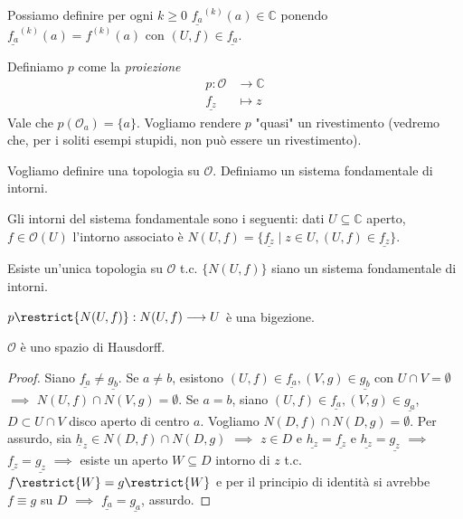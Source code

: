 \begin{oss}
  Possiamo definire per ogni $k \ge 0$ $\underline{f_a}^{(k)}(a) \in \mathbb{C}$ ponendo $\underline{f_a}^{(k)}(a)=f^{(k)}(a)$ con $(U, f) \in \underline{f_a}$.
\end{oss}

\begin{defn}
  Definiamo $p$ come la \textit{proiezione}
  \begin{align*}
    p: \mathcal{O} &\longrightarrow \mathbb{C}\\
    \underline{f_z} &\longmapsto z
  \end{align*}
  Vale che $p(\mathcal{O}_a)=\{a\}$. Vogliamo rendere $p$ "quasi" un rivestimento (vedremo che, per i soliti esempi stupidi, non può essere un rivestimento).
\end{defn}

Vogliamo definire una topologia su $\mathcal{O}$. Definiamo un sistema fondamentale di intorni.

\begin{defn}
  Gli intorni del sistema fondamentale sono i seguenti: dati $U \subseteq \mathbb{C}$ aperto, $f \in \mathcal{O}(U)$ l'intorno associato è $N(U, f)=\{\underline{f_z} \mid z \in U, (U, f) \in \underline{f_z}\}$.
\end{defn}

\begin{exc}
  Esiste un'unica topologia su $\mathcal{O}$ t.c. $\{N(U, f)\}$ siano un sistema fondamentale di intorni.
\end{exc}

\begin{oss}
  $p\restrict{N(U, f)}:N(U, f) \longrightarrow U$ è una bigezione.
\end{oss}

\begin{prop}
  $\mathcal{O}$ è uno spazio di Hausdorff.
\end{prop}

\begin{proof}
  Siano $\underline{f_a} \not= \underline{g_b}$. Se $a \not= b$, esistono $(U, f) \in \underline{f_a}, (V, g) \in \underline{g_b}$ con $U \cap V=\emptyset$ $\implies$ $N(U, f) \cap N(V, g)=\emptyset$.
  Se $a=b$, siano $(U, f) \in \underline{f_a}, (V, g) \in \underline{g_a}$, $D \subset U \cap V$ disco aperto di centro $a$. Vogliamo $N(D, f) \cap N(D, g)=\emptyset$.
  Per assurdo, sia $\underline{h}_z \in N(D, f) \cap N(D, g)$ $\implies$ $z \in D$ e $\underline{h_z}=\underline{f_z}$ e $\underline{h_z}=\underline{g_z}$ $\implies$ $\underline{f_z}=\underline{g_z}$ $\implies$ esiste un aperto $W \subseteq D$ intorno di $z$ t.c. $f\restrict{W}=g\restrict{W}$ e per il principio di identità si avrebbe $f \equiv g$ su $D$ $\implies$ $\underline{f_a}=\underline{g_a}$, assurdo.
\end{proof}

